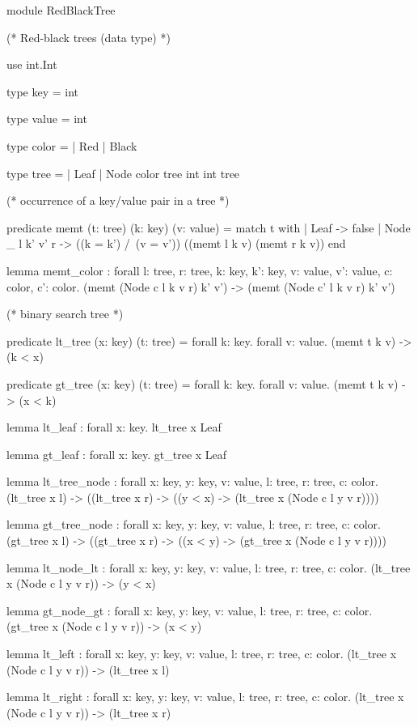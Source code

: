\begin{whylang}
module RedBlackTree

  (* Red-black trees (data type) *)

  use int.Int

  type key = int

  type value = int

  type color =
 | Red
 | Black

  type tree =
 | Leaf
 | Node color tree int int tree

 (* occurrence of a key/value pair in a tree *)

  predicate memt (t: tree) (k: key) (v: value) =
 match t with
 | Leaf -> false
 | Node _ l k' v' r -> ((k = k') /\ (v = v')) \/ ((memt l k v) \/ (memt r k v))
  end

  lemma memt_color : 
  forall l: tree, r: tree, k: key, k': key, v: value, v': value, c: color, c': color. 
  (memt (Node c l k v r) k' v') -> (memt (Node c' l k v r) k' v')

  (* binary search tree *)

  predicate lt_tree (x: key) (t: tree) =
 forall k: key. forall v: value. (memt t k v) -> (k < x)

  predicate gt_tree (x: key) (t: tree) =
 forall k: key. forall v: value. (memt t k v) -> (x < k)

  lemma lt_leaf : forall x: key. lt_tree x Leaf

  lemma gt_leaf : forall x: key. gt_tree x Leaf

  lemma lt_tree_node : 
  forall x: key, y: key, v: value, l: tree, r: tree, c: color. 
  (lt_tree x l) -> ((lt_tree x r) -> ((y < x) -> (lt_tree x (Node c l y v r))))

  lemma gt_tree_node : 
  forall x: key, y: key, v: value, l: tree, r: tree, c: color. 
  (gt_tree x l) -> ((gt_tree x r) -> ((x < y) -> (gt_tree x (Node c l y v r))))

  lemma lt_node_lt : 
  forall x: key, y: key, v: value, l: tree, r: tree, c: color. 
  (lt_tree x (Node c l y v r)) -> (y < x)

  lemma gt_node_gt : 
  forall x: key, y: key, v: value, l: tree, r: tree, c: color. 
  (gt_tree x (Node c l y v r)) -> (x < y)

  lemma lt_left : 
  forall x: key, y: key, v: value, l: tree, r: tree, c: color. 
  (lt_tree x (Node c l y v r)) -> (lt_tree x l)

  lemma lt_right : 
  forall x: key, y: key, v: value, l: tree, r: tree, c: color. 
  (lt_tree x (Node c l y v r)) -> (lt_tree x r)


\end{whylang}
